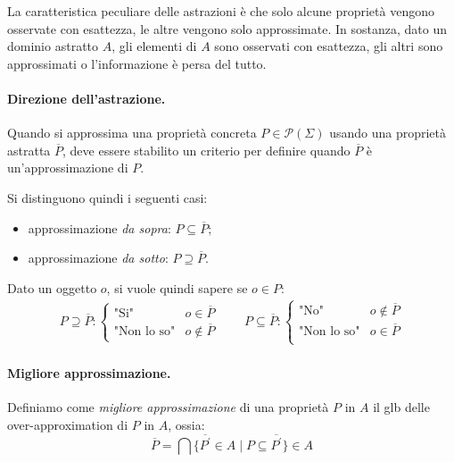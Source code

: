 \documentclass{article}
\newcommand{\parts}[1]{\mathcal{P}(#1)}
\begin{document}
        La caratteristica peculiare delle astrazioni è che solo alcune proprietà vengono osservate con esattezza, le altre vengono solo approssimate. In sostanza, dato un dominio astratto $A$, gli elementi di $A$ sono osservati con esattezza, gli altri sono approssimati o l'informazione è persa del tutto.
        \paragraph{Direzione dell'astrazione.} Quando si approssima una proprietà concreta $P \in \parts{\Sigma}$ usando una proprietà astratta $\overline{P}$, deve essere stabilito un criterio per definire quando $\overline{P}$ è un'approssimazione di $P$.
        
        Si distinguono quindi i seguenti casi:
        \begin{itemize}
            \item approssimazione \textit{da sopra}: $P \subseteq \overline{P}$;
            \item approssimazione \textit{da sotto}: $P \supseteq \overline{P}$.
        \end{itemize}   
        Dato un oggetto $o$, si vuole quindi sapere se $o \in P$:
        \begin{align*}
            P \supseteq \overline{P}: \begin{cases}
                \text{"Si"} &o \in \overline{P} \\
                \text{"Non lo so"} &o \notin  \overline{P}
            \end{cases} \qquad
            P \subseteq \overline{P}: \begin{cases}
            \text{"No"} &o \notin \overline{P} \\
            \text{"Non lo so"} &o \in \overline{P}\\
            \end{cases}
        \end{align*}      
        \paragraph{Migliore approssimazione.} Definiamo come \textit{migliore approssimazione} di una proprietà $P$ in $A$ il glb delle over-approximation di $P$ in $A$, ossia: 
        \[  
            \overline{P} = \bigcap \lbrace \overline{P^\prime} \in A\; |\; P \subseteq \overline{P^\prime} \rbrace \in A 
        \]
\end{document}
